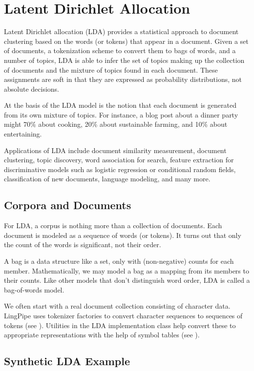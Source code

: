 \chapter{Latent Dirichlet Allocation}\label{chapter:lda}

Latent Dirichlet allocation (LDA) provides a statistical approach to
document clustering based on the words (or tokens) that appear in a
document.  Given a set of documents, a tokenization scheme to convert
them to bags of words, and a number of topics, LDA is able to infer
the set of topics making up the collection of documents and the
mixture of topics found in each document.  These assignments are soft
in that they are expressed as probability distributions, not absolute
decisions.

At the basis of the LDA model is the notion that each document is
generated from its own mixture of topics.  For instance, a blog post
about a dinner party might 70\% about cooking, 20\% about sustainable
farming, and 10\% about entertaining.

Applications of LDA include document similarity measurement, document
clustering, topic discovery, word association for search, feature
extraction for discriminative models such as logistic regression or
conditional random fields, classification of new documents, language
modeling, and many more.

\section{Corpora and Documents}

For LDA, a corpus is nothing more than a collection of documents.
Each document is modeled as a sequence of words (or tokens).  It turns
out that only the count of the words is significant, not their order.

A bag is a data structure like a set, only with (non-negative) counts
for each member.  Mathematically, we may model a bag as a mapping from
its members to their counts. Like other models that don't distinguish
word order, LDA is called a bag-of-words model.

We often start with a real document collection consisting of character
data.  LingPipe uses tokenizer factories to convert character
sequences to sequences of tokens (see ).
Utilities in the LDA implementation class help convert these to
appropriate representations with the help of symbol tables (see
).


\section{Synthetic LDA Example}

